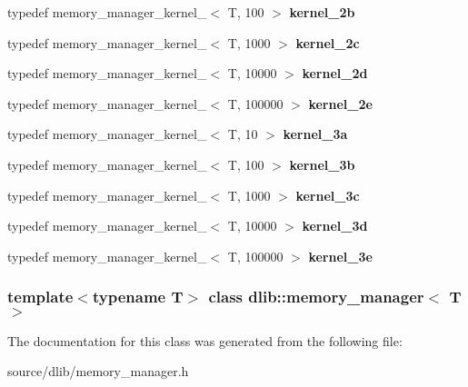 \begin{DoxyCompactItemize}
\item 
\hypertarget{classdlib_1_1memory__manager_a8d3c6fad21a82f026062bb6028d7e666}{
typedef memory\_\-manager\_\-kernel\_$<$ T, 100 $>$ {\bfseries kernel\_\-2b}}
\label{classdlib_1_1memory__manager_a8d3c6fad21a82f026062bb6028d7e666}

\item 
\hypertarget{classdlib_1_1memory__manager_ab0e90e6ca67020d4d7e1369e86b7c645}{
typedef memory\_\-manager\_\-kernel\_$<$ T, 1000 $>$ {\bfseries kernel\_\-2c}}
\label{classdlib_1_1memory__manager_ab0e90e6ca67020d4d7e1369e86b7c645}

\item 
\hypertarget{classdlib_1_1memory__manager_a0be79782aa4ebcbf978cbb1e97ee95ff}{
typedef memory\_\-manager\_\-kernel\_$<$ T, 10000 $>$ {\bfseries kernel\_\-2d}}
\label{classdlib_1_1memory__manager_a0be79782aa4ebcbf978cbb1e97ee95ff}

\item 
\hypertarget{classdlib_1_1memory__manager_adf810ba45c106521e5ecc603dbd3e280}{
typedef memory\_\-manager\_\-kernel\_$<$ T, 100000 $>$ {\bfseries kernel\_\-2e}}
\label{classdlib_1_1memory__manager_adf810ba45c106521e5ecc603dbd3e280}

\item 
\hypertarget{classdlib_1_1memory__manager_a6882580a62fbdd637c19043b17c55716}{
typedef memory\_\-manager\_\-kernel\_$<$ T, 10 $>$ {\bfseries kernel\_\-3a}}
\label{classdlib_1_1memory__manager_a6882580a62fbdd637c19043b17c55716}

\item 
\hypertarget{classdlib_1_1memory__manager_ae4c54eca186adaf6ef2d97aa4529a8af}{
typedef memory\_\-manager\_\-kernel\_$<$ T, 100 $>$ {\bfseries kernel\_\-3b}}
\label{classdlib_1_1memory__manager_ae4c54eca186adaf6ef2d97aa4529a8af}

\item 
\hypertarget{classdlib_1_1memory__manager_a959f705cb133ac372883858cb0ea63ad}{
typedef memory\_\-manager\_\-kernel\_$<$ T, 1000 $>$ {\bfseries kernel\_\-3c}}
\label{classdlib_1_1memory__manager_a959f705cb133ac372883858cb0ea63ad}

\item 
\hypertarget{classdlib_1_1memory__manager_a2d038d11c7f53979301f8e20609a3960}{
typedef memory\_\-manager\_\-kernel\_$<$ T, 10000 $>$ {\bfseries kernel\_\-3d}}
\label{classdlib_1_1memory__manager_a2d038d11c7f53979301f8e20609a3960}

\item 
\hypertarget{classdlib_1_1memory__manager_a4c5bd6bb0aa2a2f6030fc53f8c0395ff}{
typedef memory\_\-manager\_\-kernel\_$<$ T, 100000 $>$ {\bfseries kernel\_\-3e}}
\label{classdlib_1_1memory__manager_a4c5bd6bb0aa2a2f6030fc53f8c0395ff}

\end{DoxyCompactItemize}
\subsubsection*{template$<$typename T$>$ class dlib::memory\_\-manager$<$ T $>$}



The documentation for this class was generated from the following file:\begin{DoxyCompactItemize}
\item 
source/dlib/memory\_\-manager.h\end{DoxyCompactItemize}
